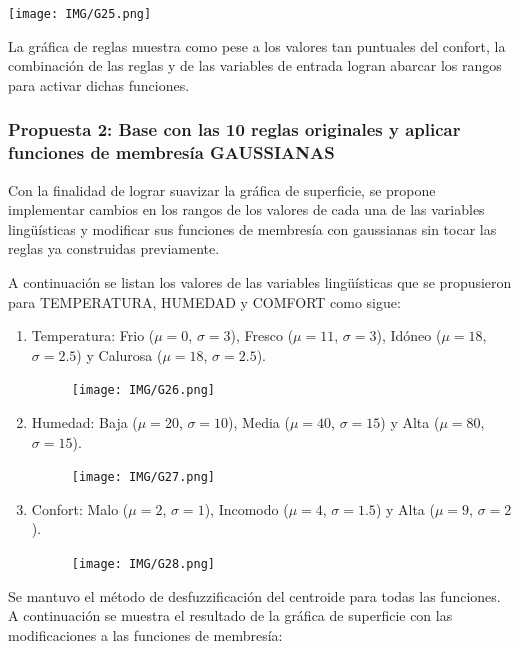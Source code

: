\documentclass[11pt, letterpaper]{article}
\begin{document}
	\texttt{[image: IMG/G25.png]}
	
	La gráfica de reglas muestra como pese a los valores tan puntuales del confort, la combinación de las reglas y de las variables de entrada logran abarcar los rangos para activar dichas funciones. \\
	
	\newpage
	
	\subsubsection{Propuesta 2: Base con las 10 reglas originales y aplicar funciones de membresía GAUSSIANAS}
	
	Con la finalidad de lograr suavizar la gráfica de superficie, se propone implementar cambios en los rangos de los valores de cada una de las variables lingüísticas y modificar sus funciones de membresía con gaussianas sin tocar las reglas ya construidas previamente.
	
	A continuación se listan los valores de las variables lingüísticas que se propusieron para TEMPERATURA, HUMEDAD y COMFORT como sigue:
	
	
	\begin{enumerate}
		\item Temperatura: Frio ($\mu = 0$, $\sigma = 3$), Fresco ($\mu = 11$, $\sigma = 3$), Idóneo ($\mu = 18$, $\sigma = 2.5$) y Calurosa ($\mu = 18$, $\sigma = 2.5$).
		\begin{figure}[h]
			\centering
			\texttt{[image: IMG/G26.png]}
		\end{figure}
		
		\item Humedad: Baja ($\mu = 20$, $\sigma = 10$), Media ($\mu = 40$, $\sigma = 15$) y Alta ($\mu = 80$, $\sigma = 15$).
		\begin{figure}[h]
			\centering
			\texttt{[image: IMG/G27.png]}
		\end{figure}
		\newpage
		\item Confort: Malo ($\mu = 2$, $\sigma = 1$), Incomodo ($\mu = 4$, $\sigma = 1.5$) y Alta ($\mu = 9$, $\sigma = 2$).
		\begin{figure}[h]
			\centering
			\texttt{[image: IMG/G28.png]}
		\end{figure}
	\end{enumerate}
	
	Se mantuvo el método de desfuzzificación del centroide para todas las funciones.\\
	
	A continuación se muestra el resultado de la gráfica de superficie con las modificaciones a las funciones de membresía: \\
	
\end{document}
